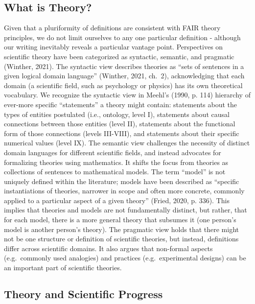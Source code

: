 \documentclass[man]{apa7}
\begin{document}
\subsection{What is Theory?}\label{what-is-theory}

Given that a pluriformity of definitions are consistent with FAIR theory principles,
we do not limit ourselves to any one particular definition - although our writing inevitably reveals a particular vantage point.
Perspectives on scientific theory have been categorized as syntactic, semantic, and pragmatic (Winther, 2021).
The syntactic view describes theories as ``sets of sentences in a given logical domain language'' (Winther, 2021, ch.~2),
acknowledging that each domain (a scientific field, such as psychology or physics) has its own theoretical vocabulary.
We recognize the syntactic view in Meehl's (1990, p. 114) hierarchy of ever-more specific ``statements'' a theory might contain:
statements about the types of entities postulated (i.e., ontology, level I),
statements about causal connections between those entities (level II),
statements about the functional form of those connections (levels III-VIII),
and statements about their specific numerical values (level IX).
The semantic view challenges the necessity of distinct domain languages for different scientific fields, and instead advocates for formalizing theories using mathematics.
It shifts the focus from theories as collections of sentences to mathematical models.
The term ``model'' is not uniquely defined within the literature;
models have been described as ``specific instantiations of theories, narrower in scope and often more concrete, commonly applied to a particular aspect of a given theory'' (Fried, 2020, p. 336).
This implies that theories and models are not fundamentally distinct, but rather, that for each model, there is a more general theory that subsumes it (one person's model is another person's theory).
The pragmatic view holds that there might not be one structure or definition of scientific theories, but instead, definitions differ across scientific domains.
It also argues that non-formal aspects (e.g.~commonly used analogies) and practices (e.g.~experimental designs) can be an important part of scientific theories.

\subsection{Theory and Scientific Progress}\label{theory-and-scientific-progress}
\end{document}
